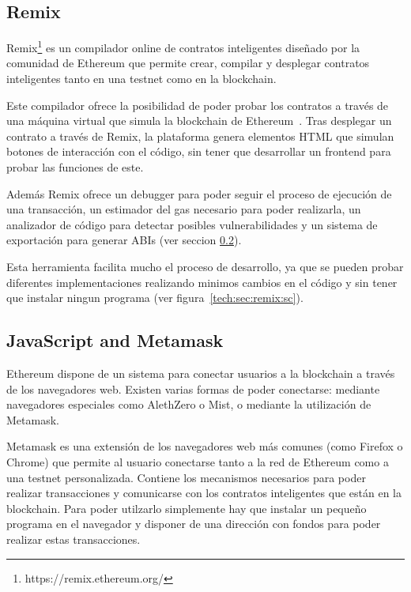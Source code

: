 
\subsection{Remix}
Remix\footnote{https://remix.ethereum.org/} es un compilador online de contratos
inteligentes diseñado por la comunidad de Ethereum que permite crear, compilar y
desplegar contratos inteligentes tanto en una testnet como en la blockchain.

Este compilador ofrece la posibilidad de poder probar los contratos a través de
una máquina virtual que simula la blockchain de
Ethereum~\cite{hildenbrandt2017kevm}. Tras desplegar un contrato a través de
Remix, la plataforma genera elementos HTML que simulan botones de interacción
con el código, sin tener que desarrollar un frontend para probar las funciones
de este.

Además Remix ofrece un debugger para poder seguir el proceso de ejecución de una
transacción, un estimador del gas necesario para poder realizarla, un analizador
de código para detectar posibles vulnerabilidades y un sistema de exportación
para generar ABIs (ver seccion \ref{jsmm}).

Esta herramienta facilita mucho el proceso de desarrollo, ya que se pueden
probar diferentes implementaciones realizando minimos cambios en el código y sin
tener que instalar ningun programa (ver figura~\ref{tech:sec:remix:sc}).

\subsection{JavaScript and Metamask}
\label{jsmm}
Ethereum dispone de un sistema para conectar usuarios a la blockchain a través
de los navegadores web. Existen varias formas de poder conectarse: mediante
navegadores especiales como AlethZero o Mist, o mediante la utilización de
Metamask.

Metamask es una extensión de los navegadores web más comunes (como Firefox o
Chrome) que permite al usuario conectarse tanto a la red de Ethereum como a una
testnet personalizada. Contiene los mecanismos necesarios para poder realizar
transacciones y comunicarse con los contratos inteligentes que están en la
blockchain. Para poder utilzarlo simplemente hay que instalar un pequeño
programa en el navegador y disponer de una dirección con fondos para poder
realizar estas transacciones.

